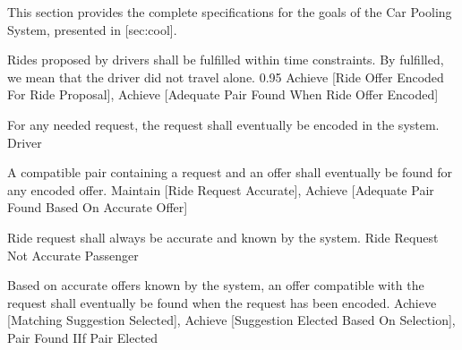
\startsubsection[title={Goal specifications}]

  This section provides the complete specifications for the goals of the Car
  Pooling System, presented in [sec:cool].


    {}

  \startkaosspec
  	 {Rides proposed by drivers shall be fulfilled within time constraints. By fulfilled, we mean that the driver did not travel alone.}
  	 {0.95}
  	 {Achieve [Ride Offer Encoded For Ride Proposal], Achieve [Adequate Pair Found When Ride Offer Encoded]}
  \stopkaosspec

  \startkaosspec
  	 {For any needed request, the request shall eventually be encoded in the system.}
  	 {Driver}
  \stopkaosspec

  \startkaosspec
  	 {A compatible pair containing a request and an offer shall eventually be found for any encoded offer.}
  	 {Maintain [Ride Request Accurate], Achieve [Adequate Pair Found Based On Accurate Offer]}
  \stopkaosspec

  \startkaosspec
  	 {Ride request shall always be accurate and known by the system.}
  	 {Ride Request Not Accurate}
  	 {Passenger}
  \stopkaosspec
  
  \startkaosspec
  	 {Based on accurate offers known by the system, an offer compatible with the request shall eventually be found when the request has been encoded.}
  	 {Achieve [Matching Suggestion Selected], Achieve [Suggestion Elected Based On Selection], Pair Found IIf Pair Elected}
  \stopkaosspec


